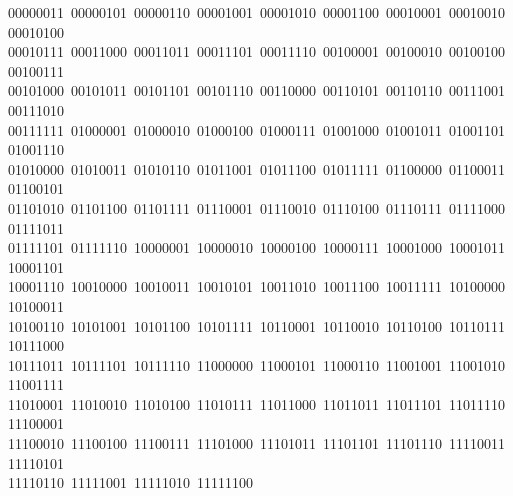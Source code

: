 \begin{flushleft}
\ 00000011\ 00000101\ 00000110\ 00001001\ 00001010\ 00001100\ 00010001\ 00010010\ 00010100\\
\ 00010111\ 00011000\ 00011011\ 00011101\ 00011110\ 00100001\ 00100010\ 00100100\ 00100111\\
\ 00101000\ 00101011\ 00101101\ 00101110\ 00110000\ 00110101\ 00110110\ 00111001\ 00111010\\
\ 00111111\ 01000001\ 01000010\ 01000100\ 01000111\ 01001000\ 01001011\ 01001101\ 01001110\\
\ 01010000\ 01010011\ 01010110\ 01011001\ 01011100\ 01011111\ 01100000\ 01100011\ 01100101\\
\ 01101010\ 01101100\ 01101111\ 01110001\ 01110010\ 01110100\ 01110111\ 01111000\ 01111011\\
\ 01111101\ 01111110\ 10000001\ 10000010\ 10000100\ 10000111\ 10001000\ 10001011\ 10001101\\
\ 10001110\ 10010000\ 10010011\ 10010101\ 10011010\ 10011100\ 10011111\ 10100000\ 10100011\\
\ 10100110\ 10101001\ 10101100\ 10101111\ 10110001\ 10110010\ 10110100\ 10110111\ 10111000\\
\ 10111011\ 10111101\ 10111110\ 11000000\ 11000101\ 11000110\ 11001001\ 11001010\ 11001111\\
\ 11010001\ 11010010\ 11010100\ 11010111\ 11011000\ 11011011\ 11011101\ 11011110\ 11100001\\
\ 11100010\ 11100100\ 11100111\ 11101000\ 11101011\ 11101101\ 11101110\ 11110011\ 11110101\\
\ 11110110\ 11111001\ 11111010\ 11111100\\
\end{flushleft}
